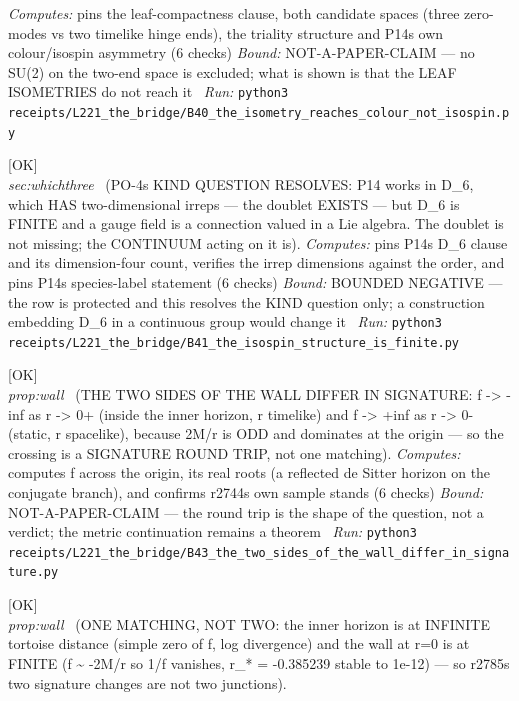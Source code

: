 \begin{description}
\emph{Computes:} pins the leaf-compactness clause, both candidate spaces (three zero-modes vs two timelike hinge ends), the triality structure and P14s own colour/isospin asymmetry (6 checks)
 \emph{Bound:} NOT-A-PAPER-CLAIM --- no SU(2) on the two-end space is excluded; what is shown is that the LEAF ISOMETRIES do not reach it
\ \emph{Run:} \texttt{python3 receipts/L221\_the\_bridge/B40\_the\_isometry\_reaches\_colour\_not\_isospin.py}
\item[\label{rcpt:B41_the_isospin_structure_is_finite}\textbf{}\quad\texttt{B41\_the\_isospin\_structure\_is\_finite}]\hfill\textsf{[OK]}\\
\textit{sec:whichthree} \ (PO-4s KIND QUESTION RESOLVES: P14 works in D\_6, which HAS two-dimensional irreps --- the doublet EXISTS --- but D\_6 is FINITE and a gauge field is a connection valued in a Lie algebra. The doublet is not missing; the CONTINUUM acting on it is). 
\emph{Computes:} pins P14s D\_6 clause and its dimension-four count, verifies the irrep dimensions against the order, and pins P14s species-label statement (6 checks)
 \emph{Bound:} BOUNDED NEGATIVE --- the row is protected and this resolves the KIND question only; a construction embedding D\_6 in a continuous group would change it
\ \emph{Run:} \texttt{python3 receipts/L221\_the\_bridge/B41\_the\_isospin\_structure\_is\_finite.py}
\item[\label{rcpt:B43_the_two_sides_of_the_wall_differ_in_signature}\textbf{}\quad\texttt{B43\_the\_two\_sides\_of\_the\_wall\_differ\_in\_signature}]\hfill\textsf{[OK]}\\
\textit{prop:wall} \ (THE TWO SIDES OF THE WALL DIFFER IN SIGNATURE: f -> -inf as r -> 0+ (inside the inner horizon, r timelike) and f -> +inf as r -> 0- (static, r spacelike), because 2M/r is ODD and dominates at the origin --- so the crossing is a SIGNATURE ROUND TRIP, not one matching). 
\emph{Computes:} computes f across the origin, its real roots (a reflected de Sitter horizon on the conjugate branch), and confirms r2744s own sample stands (6 checks)
 \emph{Bound:} NOT-A-PAPER-CLAIM --- the round trip is the shape of the question, not a verdict; the metric continuation remains a theorem
\ \emph{Run:} \texttt{python3 receipts/L221\_the\_bridge/B43\_the\_two\_sides\_of\_the\_wall\_differ\_in\_signature.py}
\item[\label{rcpt:B46_one_matching_not_two}\textbf{}\quad\texttt{B46\_one\_matching\_not\_two}]\hfill\textsf{[OK]}\\
\textit{prop:wall} \ (ONE MATCHING, NOT TWO: the inner horizon is at INFINITE tortoise distance (simple zero of f, log divergence) and the wall at r=0 is at FINITE (f \textasciitilde{} -2M/r so 1/f vanishes, r\_* = -0.385239 stable to 1e-12) --- so r2785s two signature changes are not two junctions). 

\end{description}

